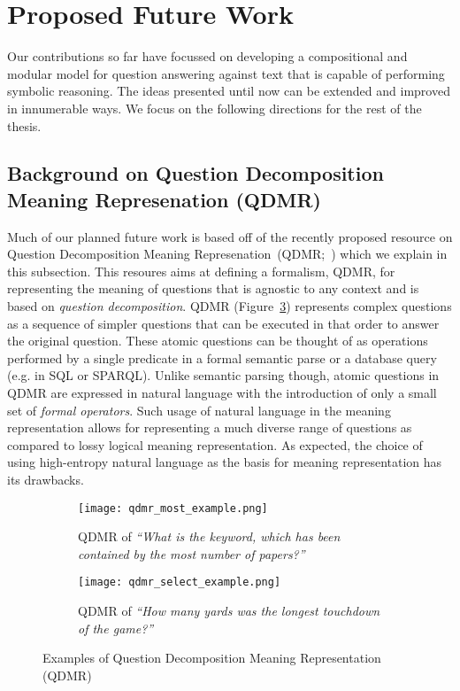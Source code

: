 \documentclass[main.tex]{subfiles}
\begin{document}
\section{Proposed Future Work} %
\label{sec:future}

Our contributions so far have focussed on developing a compositional and modular model for question answering against text that is capable of performing symbolic reasoning. The ideas presented until now can be extended and improved in innumerable ways. We focus on the following directions for the rest of the thesis.

\subsection{Background on Question Decomposition Meaning Represenation (QDMR)}
Much of our planned future work is based off of the recently proposed resource on Question Decomposition Meaning Represenation~(QDMR;~) which we explain in this subsection.
This resoures aims at defining a formalism, QDMR, for representing the meaning of questions that is agnostic to any context and is based on \textit{question decomposition}.
QDMR (Figure~\ref{fig:qdmr_examples}) represents complex questions as a sequence of simpler questions that can be executed in that order to answer the original question.
These atomic questions can be thought of as operations performed by a single predicate in a formal semantic parse or a database query (e.g. in SQL or SPARQL).
Unlike semantic parsing though, atomic questions in QDMR are expressed in natural language with the introduction of only a small set of \textit{formal operators}.  Such usage of natural language in the meaning representation allows for representing a much diverse range of questions as compared to lossy logical meaning representation. As expected, the choice of using high-entropy natural language as the basis for meaning representation has its drawbacks.

\begin{figure}[h!]
	\centering
    \begin{subfigure}[tb]{0.45\linewidth}
		\texttt{[image: qdmr\_most\_example.png]}
        \caption{QDMR of \textit{``What is the keyword, which has been contained by the most number of papers?''}}
		\label{fig:qdmr_most}
	\end{subfigure}
    \hfill
    \begin{subfigure}[tb]{0.45\linewidth}
		\texttt{[image: qdmr\_select\_example.png]}
		\caption{QDMR of \textit{``How many yards was the longest touchdown of the game?''}}
        \label{fig:qdmr_select}
    \end{subfigure}
	\caption{Examples of Question Decomposition Meaning Representation (QDMR)}
	\label{fig:qdmr_examples}
\end{figure}
\end{document}
